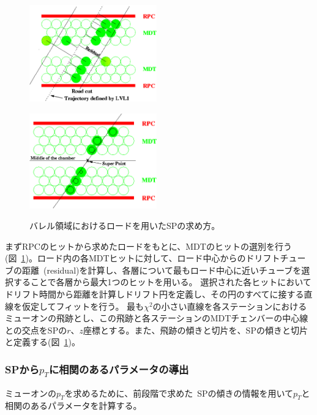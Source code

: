 \begin{figure}[h]
  \begin{minipage}[b]{0.45\linewidth}
      \centering
      \includegraphics[clip, width=5.5cm]{fig/3/mdtResidual.png}
      \label{fig:3-6-1}
  \end{minipage}
    \begin{minipage}[b]{0.5\linewidth}
      \centering
      \includegraphics[clip, width=5.5cm]{fig/3/mdtRoad.png}
      \label{fig:3-6-2}
  \end{minipage}
  \caption{バレル領域におけるロードを用いたSPの求め方\cite{article:onlineMuonReconstruction}。}
\end{figure}

まずRPCのヒットから求めたロードをもとに、MDTのヒットの選別を行う(図~\ref{fig:3-6-2})。ロード内の各MDTヒットに対して、ロード中心からのドリフトチューブの距離~(residual)を計算し、各層について最もロード中心に近いチューブを選択することで各層から最大1つのヒットを用いる。
選択された各ヒットにおいてドリフト時間から距離を計算しドリフト円を定義し、その円のすべてに接する直線を仮定してフィットを行う。
最も$\chi^2$の小さい直線を各ステーションにおけるミューオンの飛跡とし、この飛跡と各ステーションのMDTチェンバーの中心線との交点をSPの$r$、$z$座標とする。また、飛跡の傾きと切片を、SPの傾きと切片と定義する(図~\ref{fig:3-6-2})。

\subsubsection{SPから$p_T$に相関のあるパラメータの導出}
ミューオンの$p_T$を求めるために、前段階で求めた~SPの傾きの情報を用いて$p_T$と相関のあるパラメータを計算する。

